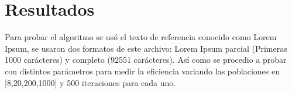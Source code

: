 \documentclass[a4paper,twocolumn,10pt]{article}
\begin{document}
\section{Resultados}


Para probar el algoritmo se usó el texto de referencia conocido como Lorem Ipsum, se usaron dos formatos de este archivo: Lorem Ipsum parcial (Primeras 1000 carácteres) y completo (92551 carácteres). Así como se procedio a probar con distintos parámetros para medir la eficiencia variando las poblaciones en [8,20,200,1000] y 500 iteraciones para cada uno.


\begin{table}[h]
\caption{Muestra los resultados para Lorem Ipsum Parcial, para los primeros 1,000 carácteres y 500 iteraciones cada uno.}
\end{table}
\end{document}
